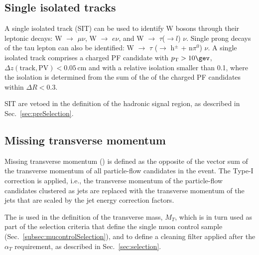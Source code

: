 \subsection{Single isolated tracks}
\label{sec:SIT}

A single isolated track (SIT) can be used to identify W bosons through their leptonic decays: 
W $\rightarrow$ $\mu \nu$, W $\rightarrow$ $e\nu$, and W $\rightarrow$ $\tau$($\rightarrow l$) $\nu$. 
Single prong decays of the tau lepton can also be identified: W $\rightarrow$ $\tau$ ($\rightarrow$ h$^{\pm}$ + n$\pi^{0}$) $\nu$. 
A single isolated track comprises a charged PF candidate with $\Pt > 10 \gev$, $\Delta z(\mathrm{track}, \mathrm{PV}) < 0.05 \, \mathrm{cm}$ 
and with a relative isolation smaller than 0.1, where the isolation is determined from the sum 
of the \Pt of the charged PF candidates within $\Delta R < 0.3$.

SIT are vetoed in the definition of the hadronic signal region, 
as described in Sec.~\ref{sec:preSelection}.


\subsection{Missing transverse momentum}
Missing transverse momentum (\met) is defined as the opposite of the vector sum
of the transverse momentum of all particle-flow candidates in the event.
The Type-I \met correction \cite{Khachatryan:2014gga} is applied, i.e., the transverse momentum of
the particle-flow candidates clustered as jets are replaced with the
transverse momentum of the jets that are scaled by the jet energy
correction factors.

The \met is used in the definition of 
the transverse mass, $M_{T}$, which is in turn used as part of
the selection criteria that define the single muon control sample 
(Sec.~\ref{subsec:mucontrolSelection}), and to define a cleaning filter applied after the
$\alpha_{T}$ requirement, as described in Sec.~\ref{sec:selection}.



